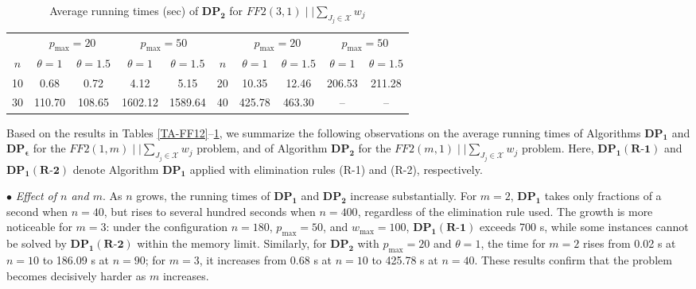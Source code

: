 \documentclass[12pt, eqno, limlimits]{article}
\begin{document}
\begin{sloppypar}
        \begin{table}[htpb]
            \footnotesize  
            \setlength{\tabcolsep}{2 pt} %
            \caption{Average running times (sec) of $\mathbf{DP_2}$ for $FF2(3, 1)\mid  \mid \sum_{J_j \in \mathcal{X}} w_j$}  \label{TA-FF31}
            \vspace{-10pt} 
            \begin{center}
                \begin{tabular}{cccccccccc}  \hline	
                    {} & \multicolumn{2}{c}{$p_{\max}=20$} & \multicolumn{2}{c}{$p_{\max}=50$} & {} & \multicolumn{2}{c}{$p_{\max}=20$} & \multicolumn{2}{c}{$p_{\max}=50$}\\ 
                    \cmidrule(lr){2-3} \cmidrule(lr){4-5} \cmidrule(lr){7-8} \cmidrule(lr){9-10}
                    $n$ & $\theta=1$ & $\theta=1.5$ & $\theta=1$ & $\theta=1.5$ & $n$ & $\theta=1$ & $\theta=1.5$ &  $\theta=1$  & $\theta=1.5$\\ 
                    10 & 0.68 & 0.72 & 4.12 & 5.15 & 20 & 10.35 & 12.46 & 206.53 & 211.28 \\
                    30 & 110.70 & 108.65 & 1602.12 & 1589.64 & 40 & 425.78 & 463.30 & -- & -- \\ 
                    \hline 	
                \end{tabular}
            \end{center} 
        \end{table}
        
        Based on the results in Tables \ref{TA-FF12}--\ref{TA-FF31}, we summarize the following observations on the average running times of Algorithms $\mathbf{DP_1}$ and $\mathbf{DP_{\epsilon}}$ for the $FF2(1, m)\mid \mid \sum_{J_j \in \mathcal{X}} w_j$ problem, and of Algorithm $\mathbf{DP_2}$ for the $FF2(m, 1)\mid \mid \sum_{J_j \in \mathcal{X}} w_j$ problem. Here, $\mathbf{DP_1(R\text{-}1)}$ and $\mathbf{DP_1(R\text{-}2)}$ denote Algorithm $\mathbf{DP_1}$ applied with elimination rules (R-1) and (R-2), respectively. 
        
        $\bullet$ \textit{Effect of $n$ and $m$}. As $n$ grows, the running times of $\mathbf{DP_1}$ and $\mathbf{DP_2}$ increase substantially. For $m=2$, $\mathbf{DP_1}$ takes only fractions of a second when $n=40$, but rises to several hundred seconds when $n=400$, regardless of the elimination rule used. The growth is more noticeable for $m=3$: under the configuration $n=180$, $p_{\max}=50$, and $w_{\max}=100$, $\mathbf{DP_1(R\text{-}1)}$ exceeds 700 s, while some instances cannot be solved by $\mathbf{DP_1(R\text{-}2)}$ within the memory limit. Similarly, for $\mathbf{DP_2}$ with $p_{\max}=20$ and $\theta=1$, the time for $m=2$ rises from 0.02 s at $n=10$ to 186.09 s at $n=90$; for $m=3$, it increases from 0.68 s at $n=10$ to 425.78 s at $n=40$. These results confirm that the problem becomes decisively harder as $m$ increases.
        

\end{sloppypar}
\end{document}
